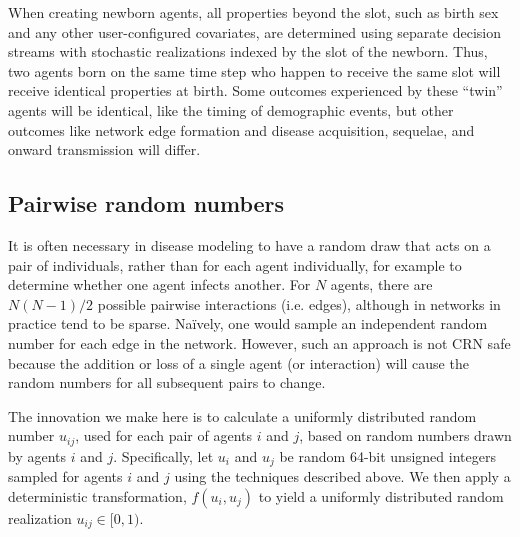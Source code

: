 \documentclass[10pt,letterpaper]{article}
\begin{document}
When creating newborn agents, all properties beyond the slot, such as birth sex and any other user-configured covariates, are determined using separate decision streams with stochastic realizations indexed by the slot of the newborn. Thus, two agents born on the same time step who happen to receive the same slot will receive identical properties at birth. Some outcomes experienced by these ``twin'' agents will be identical, like the timing of demographic events, but other outcomes like network edge formation and disease acquisition, sequelae, and onward transmission will differ.

\vspace{\baselineskip}
\noindent{}
\vspace{\baselineskip}

\subsection*{Pairwise random numbers}\label{s:pairwise}

It is often necessary in disease modeling to have a random draw that acts on a pair of individuals, rather than for each agent individually, for example to determine whether one agent infects another. For $N$ agents, there are $N(N-1)/2$ possible pairwise interactions (i.e. edges), although in networks in practice tend to be sparse. Na{\"i}vely, one would sample an independent random number for each edge in the network. However, such an approach is not CRN safe because the addition or loss of a single agent (or interaction) will cause the random numbers for all subsequent pairs to change.

The innovation we make here is to calculate a uniformly distributed random number $u_{ij}$, used for each pair of agents $i$ and $j$, based on random numbers drawn by agents $i$ and $j$. Specifically, let $u_i$ and $u_j$ be random 64-bit unsigned integers sampled for agents $i$ and $j$ using the techniques described above. We then apply a deterministic transformation, $f(u_i, u_j)$ to yield a uniformly distributed random realization $u_{ij} \in [0,1)$.
\end{document}
